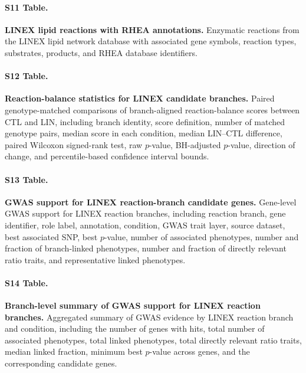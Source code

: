\documentclass[9pt,twocolumn,twoside]{rilabRxiv}
\begin{document}
\paragraph*{S11 Table.}       
\makeatletter
\def\@currentlabelname{S11 Table} 
\makeatother
\label{S11_Table}                                                                                  
\textbf{LINEX lipid reactions with RHEA annotations.} Enzymatic reactions from the LINEX lipid network database with associated gene symbols, reaction types, substrates, products, and RHEA database identifiers.

\paragraph*{S12 Table.}
\makeatletter
\def\@currentlabelname{S12 Table}
\makeatother
\label{S12_Table}
\textbf{Reaction-balance statistics for LINEX candidate branches.} Paired genotype-matched comparisons of branch-aligned reaction-balance scores between CTL and LIN, including branch identity, score definition, number of matched genotype pairs, median score in each condition, median LIN--CTL difference, paired Wilcoxon signed-rank test, raw $p$-value, BH-adjusted $p$-value, direction of change, and percentile-based confidence interval bounds.

\paragraph*{S13 Table.}
\makeatletter
\def\@currentlabelname{S13 Table}
\makeatother
\label{S13_Table}
\textbf{GWAS support for LINEX reaction-branch candidate genes.} Gene-level GWAS support for LINEX reaction branches, including reaction branch, gene identifier, role label, annotation, condition, GWAS trait layer, source dataset, best associated SNP, best $p$-value, number of associated phenotypes, number and fraction of branch-linked phenotypes, number and fraction of directly relevant ratio traits, and representative linked phenotypes.

\paragraph*{S14 Table.}
\makeatletter
\def\@currentlabelname{S14 Table}
\makeatother
\label{S14_Table}
\textbf{Branch-level summary of GWAS support for LINEX reaction branches.} Aggregated summary of GWAS evidence by LINEX reaction branch and condition, including the number of genes with hits, total number of associated phenotypes, total linked phenotypes, total directly relevant ratio traits, median linked fraction, minimum best $p$-value across genes, and the corresponding candidate genes.
\end{document}
